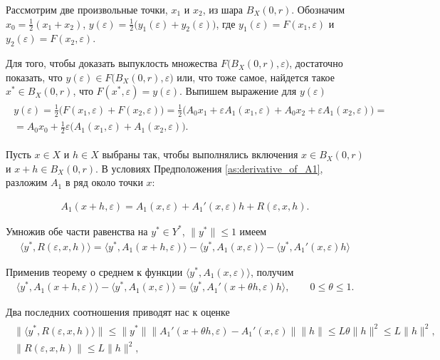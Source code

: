 \documentclass[../main.tex]{subfiles}
\begin{document}
Рассмотрим две произвольные точки, $x_1$ и $x_2$, из шара $B_X(0,r)$. 
Обозначим $x_0 = \frac{1}{2}(x_1 + x_2)$, $y(\varepsilon) = \frac{1}{2}\big(y_1(\varepsilon)  + y_2(\varepsilon)\big)$, где $y_1(\varepsilon) = F(x_1, \varepsilon)$ и $y_2(\varepsilon) = F(x_2, \varepsilon)$. 

Для того, чтобы доказать выпуклость множества $F\big(B_X(0,r),\varepsilon\big)$, достаточно показать, что $y(\varepsilon) \in F\big(B_X(0,r),\varepsilon\big)$ или, что тоже самое, найдется такое $x^* \in B_X(0,r) $, что $F(x^*, \varepsilon) = y(\varepsilon) $.
Выпишем выражение для $y(\varepsilon)$
\begin{gather}\label{y}
	\begin{gathered}
		y(\varepsilon)=
		\frac{1}{2} \big(
		F(x_1,\varepsilon)+ 
		F(x_2,\varepsilon)
		\big) = 
		\frac{1}{2} \big(
		A_0 x_1 +
		\varepsilon A_1(x_1,\varepsilon) +
		A_0 x_2 +
		\varepsilon A_1(x_2,\varepsilon) 
		\big) = \\ = A_0 x_0 + 
		\frac{1}{2} \varepsilon \big( 
		A_1(x_1,\varepsilon)+ 
		A_1(x_2,\varepsilon)
		\big).
	\end{gathered}
\end{gather}

Пусть $x \in X$ и $h \in X$ выбраны так, чтобы выполнялись включения $x\in B_X(0, r)$ и $x+h \in B_X(0, r)$.
В условиях Предположения \ref{as:derivative_of_A1}, разложим $A_1$ в ряд около точки $x$:

\begin{gather}\label{A1_series}
	A_1(x + h,\varepsilon) = A_1(x,\varepsilon) + A_1'(x,\varepsilon) h + R(\varepsilon, x, h).
\end{gather}

Умножив обе части равенства на $y^* \in Y^*$, $\|y^*\| \leqslant 1$ имеем
\begin{gather*}
	\langle y^*, R(\varepsilon, x, h) \rangle = 
	\langle y^*, A_1(x + h,\varepsilon) \rangle -
	\langle y^*, A_1(x,\varepsilon) \rangle -
	\langle y^*, A_1'(x,\varepsilon) h \rangle
\end{gather*}

Применив теорему о среднем к функции $\langle y^*, A_1(x,\varepsilon) \rangle$, получим
\begin{gather*}
	\langle y^*, A_1(x + h,\varepsilon) \rangle -
	\langle y^*, A_1(x,\varepsilon) \rangle = 
	\langle y^*, A_1'(x + \theta h,\varepsilon) h \rangle,
	\qquad
	0 \leqslant \theta \leqslant 1.
\end{gather*}

Два последних соотношения приводят нас к оценке
\begin{gather}
	\begin{gathered}
		\|\langle y^*, R(\varepsilon, x, h) \rangle \| \leqslant
		\| y^* \| 
		\| A_1'(x + \theta h,\varepsilon)  -
		A_1'(x,\varepsilon) \| 
		\| h  \| \leqslant 
		L \theta \|h\|^2 \leqslant
		L \|h\|^2, \\
		\| R(\varepsilon, x, h) \| \leqslant
		L \|h\|^2, 
	\end{gathered}
\end{gather}
\end{document}
